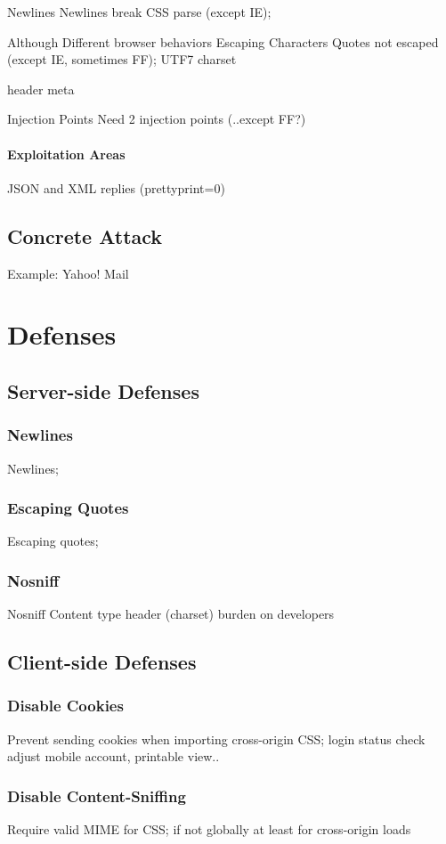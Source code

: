 \documentclass{acm_proc_article-sp}
\begin{document}
Newlines
Newlines break CSS parse (except IE);

Although Different browser behaviors
Escaping Characters
Quotes not escaped (except IE, sometimes FF);
UTF7 charset

header meta

Injection Points
Need 2 injection points (..except FF?)

\paragraph{Exploitation Areas}
JSON and XML replies
(prettyprint=0)

\subsection{Concrete Attack}
Example: Yahoo! Mail

\section{Defenses}

\subsection{Server-side Defenses}
\subsubsection{Newlines}
Newlines;
\subsubsection{Escaping Quotes}
Escaping quotes;
\subsubsection{Nosniff}
Nosniff
Content type header (charset)
burden on developers

\subsection{Client-side Defenses}
\subsubsection{Disable Cookies}
Prevent sending cookies when importing cross-origin CSS;
login status check
adjust mobile account, printable view..

\subsubsection{Disable Content-Sniffing}
Require valid MIME for CSS; if not globally at least for cross-origin loads
\end{document}
